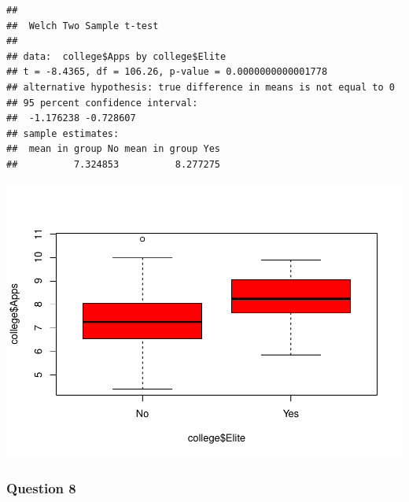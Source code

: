 \documentclass[]{article}
\newenvironment{Shaded}{\begin{snugshade}}{\end{snugshade}}
\newcommand{\AttributeTok}[1]{\textcolor[rgb]{0.77,0.63,0.00}{#1}}
\newcommand{\CommentTok}[1]{\textcolor[rgb]{0.56,0.35,0.01}{\textit{#1}}}
\newcommand{\FunctionTok}[1]{\textcolor[rgb]{0.00,0.00,0.00}{#1}}
\newcommand{\NormalTok}[1]{#1}
\newcommand{\SpecialCharTok}[1]{\textcolor[rgb]{0.00,0.00,0.00}{#1}}
\newcommand{\StringTok}[1]{\textcolor[rgb]{0.31,0.60,0.02}{#1}}
\begin{document}
\begin{Shaded}
\end{Shaded}

\begin{verbatim}
## 
##  Welch Two Sample t-test
## 
## data:  college$Apps by college$Elite
## t = -8.4365, df = 106.26, p-value = 0.0000000000001778
## alternative hypothesis: true difference in means is not equal to 0
## 95 percent confidence interval:
##  -1.176238 -0.728607
## sample estimates:
##  mean in group No mean in group Yes 
##          7.324853          8.277275
\end{verbatim}

\begin{Shaded}
\end{Shaded}

\includegraphics{assignment3_files/figure-latex/unnamed-chunk-8-1.pdf}

\hypertarget{question-8}{%
\subsubsection{Question 8}\label{question-8}}
\end{document}
